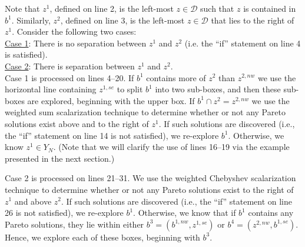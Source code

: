 \documentclass[12pt]{article}
\begin{document}
Note that $z^1$, defined on line 2, is the left-most $z \in \mathscr{D}$ such that $z$ is contained in $b^1$. Similarly, $z^2$, defined on line 3, is the left-most $z \in \mathscr{D}$ that lies to the right of $z^1$. Consider the following two cases:\\[2mm]
{\underline{Case 1}}: There is no separation between $z^1$ and $z^2$ (i.e. the ``if'' statement on line 4 is satisfied).\\[2mm]
{\underline{Case 2}}: There is separation between $z^1$ and $z^2$.\\[2mm]
Case 1 is processed on lines 4--20. If $b^1$ contains more of $z^2$ than $z^{2,nw}$ we use the horizontal line containing $z^{1,se}$ to split $b^1$ into two sub-boxes, and then these sub-boxes are explored, beginning with the upper box. If $b^1 \cap z^2 = z^{2,nw}$ we use the weighted sum scalarization technique \citep{geoffrion1968proper} to determine whether or not any Pareto solutions exist above and to the right of $z^1$. If such solutions are discovered (i.e., the ``if'' statement on line 14 is not satisfied), we re-explore $b^1$. Otherwise, we know $z^1 \in Y_N$. (Note that we will clarify the use of lines 16--19 via the example presented in the next section.)

Case 2 is processed on lines 21--31. We use the weighted Chebyshev scalarization technique \citep{steuer1983,ralphs2006improved} to determine whether or not any Pareto solutions exist to the right of $z^1$ and above $z^2$. If such solutions are discovered (i.e., the ``if'' statement on line 26 is not satisfied), we re-explore $b^1$. Otherwise, we know that if $b^1$ contains any Pareto solutions, they lie within either $b^3 = (b^{1,nw},z^{1,se})$ or $b^4 = (z^{2,nw},b^{1,se})$. Hence, we explore each of these boxes, beginning with $b^3$.
\end{document}
